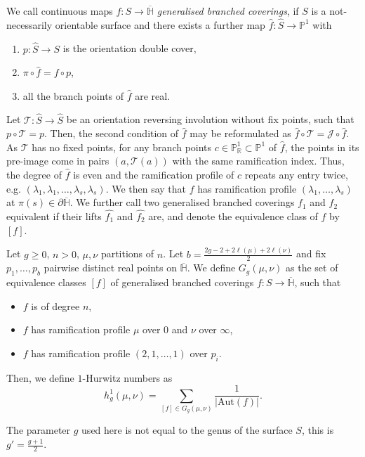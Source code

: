 \documentclass[ALCO,published]{cedram}
\begin{document}
We call continuous maps $f\colon S\to\overline{\mathbb{H}}$ \textit{generalised branched coverings}, if $S$ is a not-necessarily orientable surface and there exists a further map $\hat{f}\colon \hat{S}\to\mathbb{P}^1$ with
    \begin{enumerate}
        \item $p\colon\hat{S}\to S$ is the orientation double cover,
        \item $\pi\circ\hat{f}=f\circ p$,
        \item all the branch points of $\hat{f}$ are real.
    \end{enumerate}
Let $\mathcal{T}\colon \hat{S}\to\hat{S}$ be an orientation reversing involution without fix points, such that $p\circ \mathcal{T}=p$. Then, the second condition of $\hat{f}$ may be reformulated as $\hat{f}\circ\mathcal{T}=\mathcal{J}\circ \hat{f}$. As $\mathcal{T}$ has no fixed points, for any branch points $c\in\mathbb{P}^1_{\mathbb{R}}\subset\mathbb{P}^1$ of $\hat{f}$, the points in its pre-image come in pairs $(a,\mathcal{T}(a))$ with the same ramification index. Thus, the degree of $\hat{f}$ is even and the ramification profile of $c$ repeats any entry twice, e.g. $(\lambda_1,\lambda_1,\dots,\lambda_s,\lambda_s)$. We then say that $f$ has ramification profile $(\lambda_1,\dots,\lambda_s)$ at $\pi(s)\in\partial\overline{\mathbb{H}}$. We further call two generalised branched coverings $f_1$ and $f_2$ equivalent if their lifts $\hat{f_1}$ and $\hat{f_2}$ are, and denote the equivalence class of $f$ by $[f]$. 

\begin{defi}\label{def-nonoriented}
    Let $g\ge0$, $n>0$, $\mu,\nu$ partitions of $n$. Let $b=\frac{2g-2+2\ell(\mu)+2\ell(\nu)}{2}$ and fix $p_1,\dots,p_b$ pairwise distinct real points on $\overline{\mathbb{H}}$. We define $G_g(\mu,\nu)$ as the set of equivalence classes $[f]$ of generalised branched coverings $f\colon S\to\overline{\mathbb{H}}$, such that
    \begin{itemize}
        \item $f$ is of degree $n$,
        \item $f$ has ramification profile $\mu$ over $0$ and $\nu$ over $\infty$,
        \item $f$ has ramification profile $(2,1,\dots,1)$ over $p_i$.
    \end{itemize}
    Then, we define $1$-Hurwitz numbers as
    \begin{equation*}
        h^1_g(\mu,\nu)=\sum_{[f]\in G_g(\mu,\nu)}\frac{1}{|\mathrm{Aut}(f)|}.
    \end{equation*}
\end{defi}
The parameter $g$ used here is not equal to the genus of the surface $S$, this is $g'=\frac{g+1}{2}.$
\end{document}
